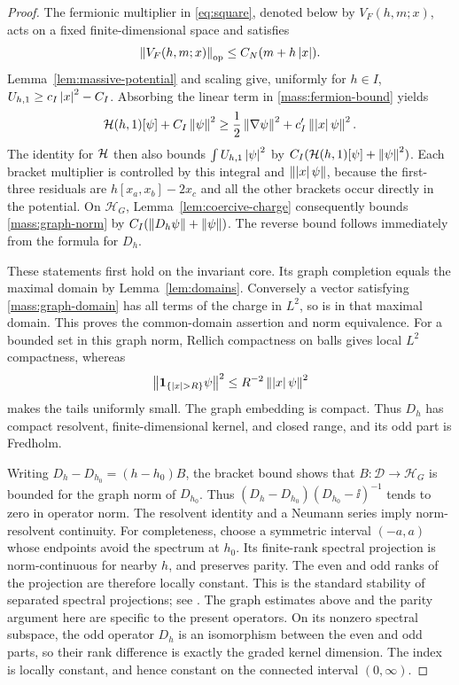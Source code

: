 \begin{proof}
The fermionic multiplier in \eqref{eq:square}, denoted below by
\(V_F(h,m;x)\), acts on a fixed finite-dimensional space and satisfies
\begin{equation}
\label{mass:fermion-bound}
 \left\lVert V_F(h,m;x)\right\rVert_{\mathrm{op}}
 \leq C_N(m+h\left\lvert x\right\rvert).
\end{equation}
Lemma~\ref{lem:massive-potential} and scaling give, uniformly for
\(h\in I\), \(U_{h,1}\geq c_I\left\lvert x\right\rvert^2-C_I\). Absorbing the
linear term in \eqref{mass:fermion-bound} yields
\[
 \mathcal H(h,1)[\psi]+C_I\left\lVert \psi\right\rVert^2
 \geq \frac12\left\lVert \nabla\psi\right\rVert^2+c'_I\left\lVert \left\lvert x\right\rvert\psi\right\rVert^2.
\]
The identity for \(\mathcal H\) then also bounds
\(\int U_{h,1}\left\lvert \psi\right\rvert^2\) by
\(C_I(\mathcal H(h,1)[\psi]+\left\lVert \psi\right\rVert^2)\). Each bracket multiplier
is controlled by this integral and \(\left\lVert \left\lvert x\right\rvert\psi\right\rVert\), because
the first-three residuals are \(h[x_a,x_b]-2x_c\) and all the other
brackets occur directly in the potential. On \(\mathscr H_G\),
Lemma~\ref{lem:coercive-charge} consequently bounds
\eqref{mass:graph-norm} by \(C_I(\left\lVert D_h\psi\right\rVert+\left\lVert \psi\right\rVert)\).
The reverse bound follows immediately from the formula for \(D_h\).

These statements first hold on the invariant core. Its graph
completion equals the maximal domain by Lemma~\ref{lem:domains}.
Conversely a vector satisfying \eqref{mass:graph-domain} has all
terms of the charge in \(L^2\), so is in that maximal domain.
This proves the common-domain assertion and norm equivalence.
For a bounded set in this graph norm, Rellich compactness on balls
gives local \(L^2\) compactness, whereas
\[
 \left\lVert \mathbf1_{\{\left\lvert x\right\rvert>R\}}\psi\right\rVert^2
 \leq R^{-2}\left\lVert \left\lvert x\right\rvert\psi\right\rVert^2
\]
makes the tails uniformly small. The graph embedding is compact.
Thus \(D_h\) has compact resolvent, finite-dimensional kernel, and
closed range, and its odd part is Fredholm.

Writing \(D_h-D_{h_0}=(h-h_0)B\), the bracket bound shows that
\(B:\mathcal D\to\mathscr H_G\) is bounded for the graph norm of
\(D_{h_0}\). Thus
\((D_h-D_{h_0})(D_{h_0}-\ii)^{-1}\) tends to zero in operator norm.
The resolvent identity and a Neumann series imply norm-resolvent
continuity. For completeness, choose a symmetric interval
\((-a,a)\) whose endpoints avoid the spectrum at \(h_0\). Its
finite-rank spectral projection is norm-continuous for nearby
\(h\), and preserves parity. The even and odd ranks of the
projection are therefore locally constant. This is the standard stability
of separated spectral projections; see \cite[Chapter~IV, Section~3.4,
Theorem~3.16]{Kato1995}. The graph estimates above and the parity argument
here are specific to the present operators. On its nonzero spectral
subspace, the odd operator \(D_h\) is an isomorphism between the
even and odd parts, so their rank difference is exactly the graded
kernel dimension. The index is locally constant, and hence
constant on the connected interval \((0,\infty)\).
\end{proof}

